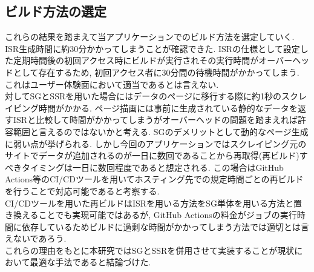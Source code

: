 \subsection{ビルド方法の選定}
これらの結果を踏まえて当アプリケーションでのビルド方法を選定していく.\\
ISR生成時間に約30分かかってしまうことが確認できた. ISRの仕様として設定した定期時間後の初回アクセス時にビルドが実行されその実行時間がオーバーヘッドとして存在するため, 初回アクセス者に30分間の待機時間がかかってしまう.
これはユーザー体験面において適当であるとは言えない.\\
対してSGとSSRを用いた場合にはデータのページに移行する際に約1秒のスクレイピング時間がかかる. 
ページ描画には事前に生成されている静的なデータを返すISRと比較して時間がかかってしまうがオーバーヘッドの問題を踏まえれば許容範囲と言えるのではないかと考える.
SGのデメリットとして動的なページ生成に弱い点が挙げられる.
しかし今回のアプリケーションではスクレイピング元のサイトでデータが追加されるのが一日に数回であることから再取得(再ビルド)すべきタイミングは一日に数回程度であると想定される.
この場合はGitHub Actions等のCI/CDツールを用いてホスティング先での規定時間ごとの再ビルドを行うことで対応可能であると考察する.\\
CI/CDツールを用いた再ビルドはISRを用いる方法をSG単体を用いる方法と置き換えることでも実現可能ではあるが, GitHub Actionsの料金がジョブの実行時間に依存しているためビルドに過剰な時間がかかってしまう方法では適切とは言えないであろう.\\
これらの理由をもとに本研究ではSGとSSRを併用させて実装することが現状において最適な手法であると結論づけた.

